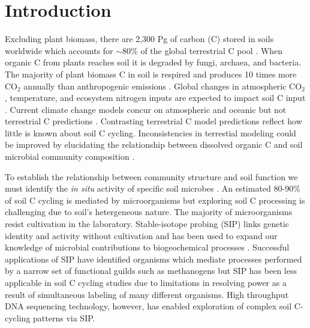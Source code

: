 \section{Introduction}
Excluding plant biomass, there are 2,300 Pg of carbon (C) stored in soils
worldwide which accounts for $\sim$80\% of the global terrestrial C pool
\citep{Amundson_2001,BATJES_1996}. When organic C from plants reaches soil it
is degraded by fungi, archaea, and bacteria.  The majority of plant biomass
C in soil is respired and produces 10 times more CO$_{2}$ annually than
anthropogenic emissions \citep{chapin2002principles}. Global
changes in atmospheric CO$_{2}$, temperature, and ecosystem nitrogen inputs are
expected to impact soil C input \citep{Groenigen_2006}. Current climate change
models concur on atmospheric and oceanic but not terrestrial C predictions
\citep{Friedlingstein_2006}. Contrasting terrestrial C model predictions
reflect how little is known about soil C cycling. Inconsistencies in
terrestial modeling could be improved by elucidating the relationship between
dissolved organic C and soil microbial community composition \citep{Neff_2001}.

To establish the relationship between community structure and soil function we
must identify the \textit{in situ} activity of specific soil microbes 
\citep{O_Donnell_2002}. An estimated 80-90\% of soil C cycling is
mediated by microorganisms \citep{ColemanCrossley_1996,Nannipieri_2003} but
exploring soil C processing is challenging due to soil's hetergeneous nature.
The majority of microorganisms resist cultivation in the laboratory.
Stable-isotope probing (SIP) links genetic identity and activity without
cultivation and has been used to expand our knowledge of microbial
contributions to biogeochemical processes \citep{Chen_Murrell_2010}. Successful
applications of SIP have identified organisms which mediate processes performed
by a narrow set of functional guilds such as methanogens \citep{Lu_2005} but
SIP has been less applicable in soil C cycling studies due to limitations in
resolving power as a result of simultaneous labeling of many different
organisms. High throughput DNA sequencing technology, however, has enabled
exploration of complex soil C-cycling patterns via SIP.

